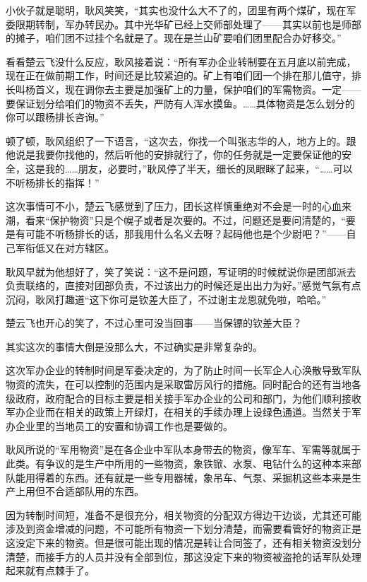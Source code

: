 小伙子就是聪明，耿风笑笑，“其实也没什么大不了的，团里有两个煤矿，现在军委限期转制，军办转民办。其中光华矿已经上交师部处理了——其实以前也是师部的摊子，咱们团不过挂个名就是了。现在是兰山矿要咱们团里配合办好移交。”

看看楚云飞没什么反应，耿风接着说：“所有军办企业转制要在五月底以前完成，现在正在做前期工作，时间还是比较紧迫的。矿上有咱们团一个排在那儿值守，排长叫杨首义，现在调你去主要是加强矿上的力量，保护咱们的军需物资。一定——要保证划分给咱们的物资不丢失，严防有人浑水摸鱼。……具体物资是怎么划分的你可以跟杨排长咨询。”

顿了顿，耿风组织了一下语言，“这次去，你找一个叫张志华的人，地方上的。跟他说是我要你找他的，然后听他的安排就行了，你的任务就是一定要保证他的安全，这是我的……朋友，必要时，”耿风停了半天，细长的凤眼眯了起来，“……可以不听杨排长的指挥！”

这次事情可不小，楚云飞感觉到了压力，团长这样慎重绝对不会是一时的心血来潮，看来“保护物资”只是个幌子或者是次要的。不过，问题还是要问清楚的，“要是有可能不听杨排长的话，那我用什么名义去呀？起码他也是个少尉吧？”——自己军衔低又在对方辖区。

耿风早就为他想好了，笑了笑说：“这不是问题，写证明的时候就说你是团部派去负责联络的，直接对团部负责，不过该出力的时候还是出出力为好。”感觉气氛有点沉闷，耿风打趣道“这下你可是钦差大臣了，不过谢主龙恩就免啦，哈哈。”

楚云飞也开心的笑了，不过心里可没当回事——当保镖的钦差大臣？

其实这次的事情大倒是没那么大，不过确实是非常复杂的。

这次军办企业的转制时间是军委决定的，为了防止时间一长军企人心涣散导致军队物资的流失，在可以控制的范围内是采取雷厉风行的措施。同时配合的还有当地各级政府，政府配合的目标主要是相关接手军办企业的公司和部门，为他们顺利接收军办企业而在相关的政策上开绿灯，在相关的手续办理上设绿色通道。当然关于军办企业里的当地员工的安置和协调工作也是要做的。

耿风所说的“军用物资”是在各企业中军队本身带去的物资，像军车、军需等就属于此类。有争议的是生产中所用的一些物资，象铁锨、水泵、电钻什么的这种本来部队能用得着的东西。还有就是一些专用器械，象吊车、气泵、采掘机这些本来是生产上用但不合适部队用的东西。

因为转制时间短，准备不是很充分，相关物资的分配双方得边干边谈，尤其还可能涉及到资金增减的问题，不可能所有物资一下划分清楚，而需要看管好的物资正是这没定下来的物资。但是很可能出现的情况是转让合同签了，还有相关物资没划分清楚，而接手方的人员并没有全部到位，那这没定下来的物资被盗抢的话军队处理起来就有点棘手了。

